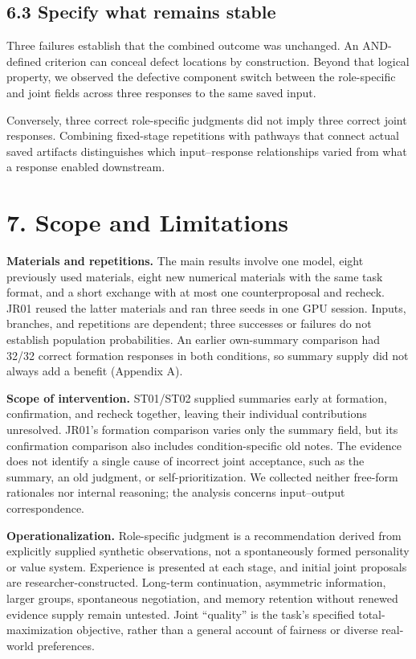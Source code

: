\documentclass[10pt,a4paper]{article}
\begin{document}
\subsection{6.3 Specify what remains stable}\label{paper-03-specify-what-remains-stable}

Three failures establish that the combined outcome was unchanged. An AND-defined criterion can conceal defect locations by construction. Beyond that logical property, we observed the defective component switch between the role-specific and joint fields across three responses to the same saved input.

Conversely, three correct role-specific judgments did not imply three correct joint responses. Combining fixed-stage repetitions with pathways that connect actual saved artifacts distinguishes which input--response relationships varied from what a response enabled downstream.

\section{7. Scope and Limitations}\label{paper-03-scope-and-limitations}

\textbf{Materials and repetitions.} The main results involve one model, eight previously used materials, eight new numerical materials with the same task format, and a short exchange with at most one counterproposal and recheck. JR01 reused the latter materials and ran three seeds in one GPU session. Inputs, branches, and repetitions are dependent; three successes or failures do not establish population probabilities. An earlier own-summary comparison had 32/32 correct formation responses in both conditions, so summary supply did not always add a benefit (Appendix A).

\textbf{Scope of intervention.} ST01/ST02 supplied summaries early at formation, confirmation, and recheck together, leaving their individual contributions unresolved. JR01's formation comparison varies only the summary field, but its confirmation comparison also includes condition-specific old notes. The evidence does not identify a single cause of incorrect joint acceptance, such as the summary, an old judgment, or self-prioritization. We collected neither free-form rationales nor internal reasoning; the analysis concerns input--output correspondence.

\textbf{Operationalization.} Role-specific judgment is a recommendation derived from explicitly supplied synthetic observations, not a spontaneously formed personality or value system. Experience is presented at each stage, and initial joint proposals are researcher-constructed. Long-term continuation, asymmetric information, larger groups, spontaneous negotiation, and memory retention without renewed evidence supply remain untested. Joint ``quality'' is the task's specified total-maximization objective, rather than a general account of fairness or diverse real-world preferences.
\end{document}
